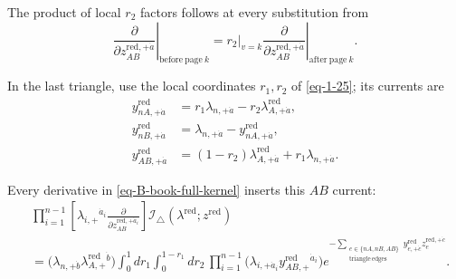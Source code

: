 \documentclass[11pt]{article}
\numberwithin{equation}{section}
\numberwithin{figure}{section}
\numberwithin{table}{section}
\begin{document}
The product of local $r_2$ factors follows at every substitution from
\begin{equation*}
\left.\frac{\partial}{\partial z_{AB}^{\mathrm{red},+\dot a}}\right|_{\mathrm{before\ page}\ k}
    =\left.r_2\right|_{v=k}
    \left.\frac{\partial}{\partial z_{AB}^{\mathrm{red},+\dot a}}\right|_{\mathrm{after\ page}\ k}.
\end{equation*}

In the last triangle, use the local coordinates $r_1,r_2$ of \eqref{eq-1-25}; its currents are
\begin{equation*}
\begin{aligned}
    y_{nA,+\dot a}^{\mathrm{red}}&=r_1\lambda_{n,+\dot a}-r_2\lambda_{A,+\dot a}^{\mathrm{red}},\\
    y_{nB,+\dot a}^{\mathrm{red}}&=\lambda_{n,+\dot a}-y_{nA,+\dot a}^{\mathrm{red}},\\
    y_{AB,+\dot a}^{\mathrm{red}}&=(1-r_2)\lambda_{A,+\dot a}^{\mathrm{red}}+r_1\lambda_{n,+\dot a}.
    \end{aligned}
\end{equation*}

Every derivative in \eqref{eq-B-book-full-kernel} inserts this $AB$ current:
\begin{equation*}
\begin{aligned}
    &\prod_{i=1}^{n-1}
    \left[\lambda_{i,+}{}^{\dot a_i}
    \frac{\partial}{\partial z_{AB}^{\mathrm{red},+\dot a_i}}\right]
    \mathcal I_\triangle(\lambda^{\mathrm{red}};z^{\mathrm{red}})\\
    &=\bigl(\lambda_{n,+\dot b}\lambda_{A,+}^{\mathrm{red}}{}^{\dot b}\bigr)
    \int_0^1dr_1\int_0^{1-r_1}dr_2\,
    \prod_{i=1}^{n-1}
    \bigl(\lambda_{i,+\dot a_i}y_{AB,+}^{\mathrm{red}}{}^{\dot a_i}\bigr)
     e^{-\sum_{\substack{e\in\{nA,nB,AB\}\\\mathrm{triangle\ edges}}}
     y_{e,+\dot c}^{\mathrm{red}}z_e^{\mathrm{red},+\dot c}}.
    \end{aligned}
\end{equation*}
\end{document}
